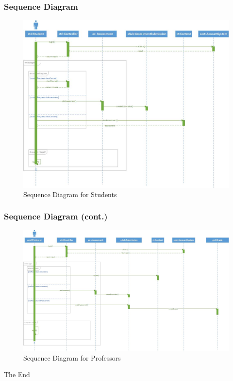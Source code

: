\documentclass{beamer}
\begin{document}
\begin{frame}
	\frametitle{Sequence Diagram}
	\begin{figure}[!ht]
		\begin{center}
			\includegraphics[width=\textwidth,height=0.7\textheight,keepaspectratio]{studSeq}
		\end{center}
		\caption{Sequence Diagram for Students}
	\end{figure}
\end{frame}

\begin{frame}
	\frametitle{Sequence Diagram (cont.)}
	\begin{figure}[!ht]
		\begin{center}
			\includegraphics[width=\textwidth,height=0.7\textheight,keepaspectratio]{profSeq}
		\end{center}
		\caption{Sequence Diagram for Professors}
	\end{figure}
\end{frame}

\begin{frame}
\Huge{The End}
\end{frame}

\end{document}
